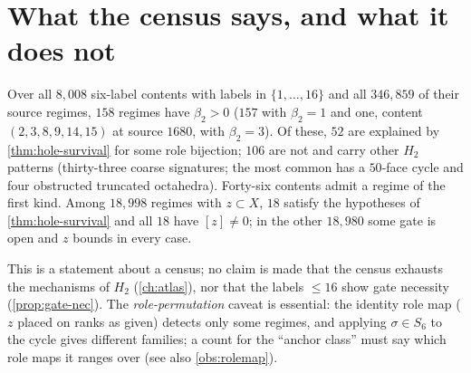 \section{What the census says, and what it does not}
\begin{observation}\label{obs:census-H2}
Over all $8{,}008$ six-label contents with labels in $\{1,\dots,16\}$ and all $346{,}859$ of their source regimes, $158$ regimes have $\beta_2>0$ ($157$ with $\beta_2=1$ and one, content $(2,3,8,9,14,15)$ at source $1680$, with $\beta_2=3$). Of these, $52$ are explained by \cref{thm:hole-survival} for some role bijection; $106$ are not and carry other $H_2$ patterns (thirty-three coarse signatures; the most common has a $50$-face cycle and four obstructed truncated octahedra). Forty-six contents admit a regime of the first kind. Among $18{,}998$ regimes with $z\subset X$, $18$ satisfy the hypotheses of \cref{thm:hole-survival} and all $18$ have $[z]\ne0$; in the other $18{,}980$ some gate is open and $z$ bounds in every case.
\end{observation}
This is a statement about a census; no claim is made that the census exhausts the mechanisms of $H_2$ (\cref{ch:atlas}), nor that the labels $\le16$ show gate necessity (\cref{prop:gate-nec}). The \emph{role-permutation} caveat is essential: the identity role map ($z$ placed on ranks as given) detects only some regimes, and applying $\sigma\in S_6$ to the cycle gives different families; a count for the ``anchor class'' must say which role maps it ranges over (see also \cref{obs:rolemap}).

